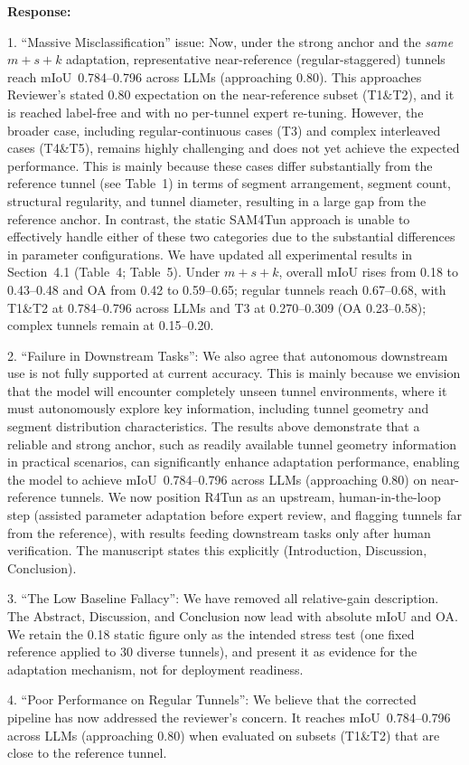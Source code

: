 \documentclass[11pt,a4paper]{article}
\newcommand{\MSReferenceTunnelTable}{Table~4}
\newcommand{\MSMainResultsTable}{Table~5}
\newenvironment{responseblock}{%
  \par\smallskip\noindent\textbf{Response:}\par
  \begingroup\color{responsegreen}
}{%
  \endgroup\smallskip
}
\begin{document}
\begin{responseblock}
1. ``Massive Misclassification'' issue: Now, under the strong anchor and the \emph{same} $m+s+k$ adaptation, representative near-reference (regular-staggered) tunnels reach mIoU~0.784--0.796 across LLMs (approaching 0.80). This approaches Reviewer's stated 0.80 expectation on the near-reference subset (T1\&T2), and it is reached label-free and with no per-tunnel expert re-tuning. However, the broader case, including regular-continuous cases (T3) and complex interleaved cases (T4\&T5), remains highly challenging and does not yet achieve the expected performance. This is mainly because these cases differ substantially from the reference tunnel (see Table~1) in terms of segment arrangement, segment count, structural regularity, and tunnel diameter, resulting in a large gap from the reference anchor. In contrast, the static SAM4Tun approach is unable to effectively handle either of these two categories due to the substantial differences in parameter configurations. We have updated all experimental results in Section~4.1 (\MSReferenceTunnelTable; \MSMainResultsTable). Under $m+s+k$, overall mIoU rises from 0.18 to 0.43--0.48 and OA from 0.42 to 0.59--0.65; regular tunnels reach 0.67--0.68, with T1\&T2 at 0.784--0.796 across LLMs and T3 at 0.270--0.309 (OA 0.23--0.58); complex tunnels remain at 0.15--0.20.

2. ``Failure in Downstream Tasks'': We also agree that autonomous downstream use is not fully supported at current accuracy. This is mainly because we envision that the model will encounter completely unseen tunnel environments, where it must autonomously explore key information, including tunnel geometry and segment distribution characteristics. The results above demonstrate that a reliable and strong anchor, such as readily available tunnel geometry information in practical scenarios, can significantly enhance adaptation performance, enabling the model to achieve mIoU~0.784--0.796 across LLMs (approaching 0.80) on near-reference tunnels. We now position R4Tun as an upstream, human-in-the-loop step (assisted parameter adaptation before expert review, and flagging tunnels far from the reference), with results feeding downstream tasks only after human verification. The manuscript states this explicitly (Introduction, Discussion, Conclusion).

3. ``The Low Baseline Fallacy'': We have removed all relative-gain description. The Abstract, Discussion, and Conclusion now lead with absolute mIoU and OA. We retain the 0.18 static figure only as the intended stress test (one fixed reference applied to 30 diverse tunnels), and present it as evidence for the adaptation mechanism, not for deployment readiness.

4. ``Poor Performance on Regular Tunnels'': We believe that the corrected pipeline has now addressed the reviewer’s concern. It reaches mIoU~0.784--0.796 across LLMs (approaching 0.80) when evaluated on subsets (T1\&T2) that are close to the reference tunnel.
\end{responseblock}
\end{document}

